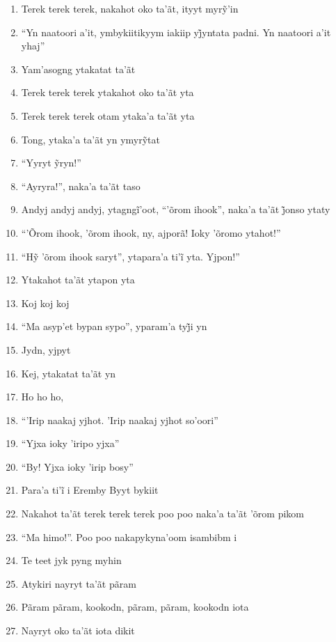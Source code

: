 \begin{enumerate}
 \item Terek terek terek, nakahot oko ta’ãt, ityyt myrỹ’in
 \item ``Yn naatoori a’it, ymbykiitikyym iakiip yj̃yntata padni. Yn naatoori a’it yhaj''
 \item Yam'asogng ytakatat ta'ãt
 \begin{center}\end{center}
 \item Terek terek terek ytakahot oko ta'ãt yta
 \item Terek terek terek otam ytaka'a ta'ãt yta
 \item Tong, ytaka’a ta’ãt yn ymyrỹtat
 \item ``Yyryt ỹryn!''
 \item ``Ayryra!'', naka'a ta'ãt taso
 \item Andyj andyj andyj, ytagngĩ’oot, ``’õrom ihook'', naka’a ta’ãt j̃onso ytaty
 \item ``'Õrom ihook, 'õrom ihook, ny, ajporã! Ioky 'õromo ytahot!''
 \item ``Hỹ ’õrom ihook saryt'', ytapara’a ti’ĩ yta. Yjpon!''
 \item Ytakahot ta'ãt ytapon yta
 \item Koj koj koj
 \item ``Ma asyp’et bypan sypo'', yparam’a tyj̃i yn
 \item Jydn, yjpyt
 \item Kej, ytakatat ta'ãt yn
 \begin{center}\end{center}
 \item Ho ho ho,
 \item ``'Irip naakaj yjhot. 'Irip naakaj yjhot so'oori''
 \item ``Yjxa ioky 'iripo yjxa''
 \item ``By! Yjxa ioky 'irip bosy''
 \item Para’a ti’ĩ i Eremby Byyt bykiit
 \item Nakahot ta'ãt terek terek terek poo poo naka'a ta'ãt 'õrom pikom
 \item ``Ma himo!''. Poo poo nakapykyna'oom isambibm i
 \item Te teet jyk pyng myhin
 \begin{center}\end{center}
 \item Atykiri nayryt ta'ãt pãram
 \item Pãram pãram, kookodn, pãram, pãram, kookodn iota
 \item Nayryt oko ta'ãt iota dikit

\end{enumerate}
